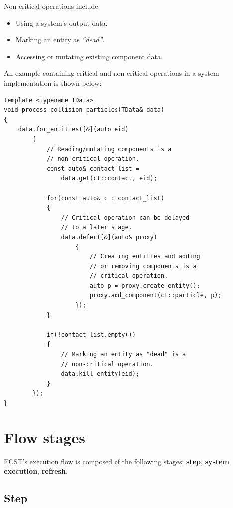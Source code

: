 \documentclass[twoside, 12pt, a4paper, openany]{book}
\begin{document}
Non-critical operations include:

\begin{itemize}
\item
  Using a system's output data.
\item
  Marking an entity as \emph{``dead''}.
\item
  Accessing or mutating existing component data.
\end{itemize}

An example containing critical and non-critical operations in a system
implementation is shown below:

\begin{verbatim}
template <typename TData>
void process_collision_particles(TData& data)
{
    data.for_entities([&](auto eid)
        {
            // Reading/mutating components is a
            // non-critical operation.
            const auto& contact_list =
                data.get(ct::contact, eid);

            for(const auto& c : contact_list)
            {
                // Critical operation can be delayed
                // to a later stage.
                data.defer([&](auto& proxy)
                    {
                        // Creating entities and adding
                        // or removing components is a
                        // critical operation.
                        auto p = proxy.create_entity();
                        proxy.add_component(ct::particle, p);
                    });
            }

            if(!contact_list.empty())
            {
                // Marking an entity as "dead" is a
                // non-critical operation.
                data.kill_entity(eid);
            }
        });
}
\end{verbatim}

\section{Flow stages}\label{flow-stages}

ECST's execution flow is composed of the following stages:
\textbf{step}, \textbf{system execution}, \textbf{refresh}.

\hypertarget{step_stage}{\subsection{Step}\label{step_stage}}
\end{document}
